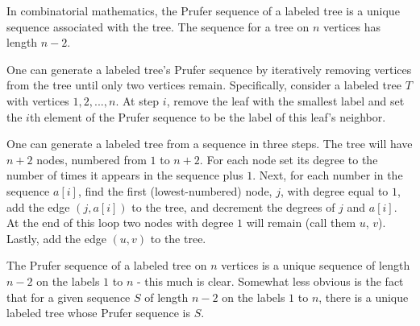 In combinatorial mathematics, the Prufer sequence of a labeled tree is a unique sequence associated with the tree. The sequence for a tree on $n$ vertices has length $n-2$.

One can generate a labeled tree's Prufer sequence by iteratively removing vertices from the tree until only two vertices remain. Specifically, consider a labeled tree $T$ with vertices ${1, 2, ..., n}$. At step $i$, remove the leaf with the smallest label and set the $i$th element of the Prufer sequence to be the label of this leaf's neighbor.

One can generate a labeled tree from a sequence in three steps. The tree will have $n+2$ nodes, numbered from $1$ to $n+2$. For each node set its degree to the number of times it appears in the sequence plus $1$. Next, for each number in the sequence $a[i]$, find the first (lowest-numbered) node, $j$, with degree equal to $1$, add the edge $(j, a[i])$ to the tree, and decrement the degrees of $j$ and $a[i]$. At the end of this loop two nodes with degree $1$ will remain (call them $u$, $v$). Lastly, add the edge $(u,v)$ to the tree.

The Prufer sequence of a labeled tree on $n$ vertices is a unique sequence of length $n-2$ on the labels $1$ to $n$ - this much is clear. Somewhat less obvious is the fact that for a given sequence $S$ of length $n-2$ on the labels $1$ to $n$, there is a unique labeled tree whose Prufer sequence is $S$.

